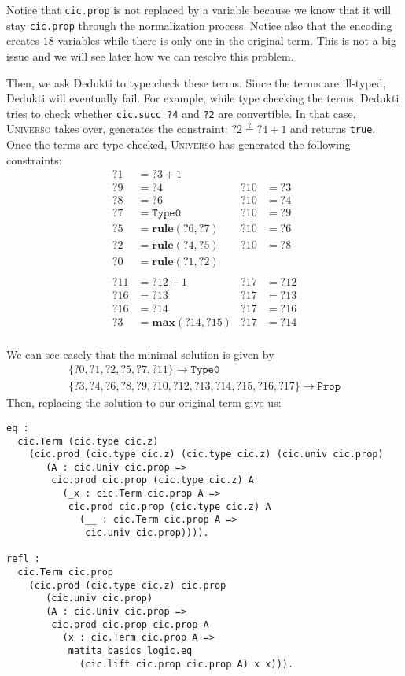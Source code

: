 \documentclass[conference]{IEEEtran}
\newcommand{\universo}{\textsc{Universo}}
\begin{document}
Notice that \texttt{cic.prop} is not replaced by a variable because we know that it will stay \texttt{cic.prop} through the normalization process. Notice also that the encoding creates \(18\) variables while there is only one in the original term. This is not a big issue and we will see later how we can resolve this problem.

Then, we ask Dedukti to type check these terms. Since the terms are ill-typed, Dedukti will eventually fail. For example, while type checking the terms, Dedukti tries to check whether \texttt{cic.succ ?4} and \texttt{?2} are convertible. In that case, \universo{} takes over, generates the constraint: \(?2 \stackrel{?}{=} ?4 + 1\) and returns \texttt{true}. Once the terms are type-checked, \universo{} has generated the following constraints:
\begin{align*}
  ?1 &= ?3 + 1 \\
  ?9 &= ?4     & ?10 &= ?3\\
  ?8 &= ?6     & ?10 &= ?4\\
  ?7 &= \mathtt{Type0} & ?10 &= ?9\\
  ?5 &= \mathbf{rule}(?6,?7)     & ?10 &= ?6\\
  ?2 &= \mathbf{rule}(?4,?5)     & ?10 &= ?8\\
  ?0 &= \mathbf{rule}(?1,?2)\\
  \\
  ?11 &= ?12 + 1 & ?17 &= ?12\\
  ?16 &= ?13 & ?17 &= ?13\\
  ?16 &= ?14 & ?17 &= ?16\\
  ?3 &= \mathbf{max}(?14,?15) & ?17 &= ?14\\
\end{align*}

We can see easely that the minimal solution is given by
\begin{align*}
  \{?0,?1,?2,?5,?7,?11\} \to \mathtt{Type0}\\
  \{?3,?4,?6,?8,?9,?10,?12, ?13, ?14, ?15, ?16, ?17\} \to \mathtt{Prop}
\end{align*}
Then, replacing the solution to our original term give us:

\begin{verbatim}
eq :
  cic.Term (cic.type cic.z)
    (cic.prod (cic.type cic.z) (cic.type cic.z) (cic.univ cic.prop)
       (A : cic.Univ cic.prop =>
        cic.prod cic.prop (cic.type cic.z) A
          (_x : cic.Term cic.prop A =>
           cic.prod cic.prop (cic.type cic.z) A
             (__ : cic.Term cic.prop A =>
              cic.univ cic.prop)))).

refl :
  cic.Term cic.prop
    (cic.prod (cic.type cic.z) cic.prop
       (cic.univ cic.prop)
       (A : cic.Univ cic.prop =>
        cic.prod cic.prop cic.prop A
          (x : cic.Term cic.prop A =>
           matita_basics_logic.eq
             (cic.lift cic.prop cic.prop A) x x))).
\end{verbatim}
\end{document}
